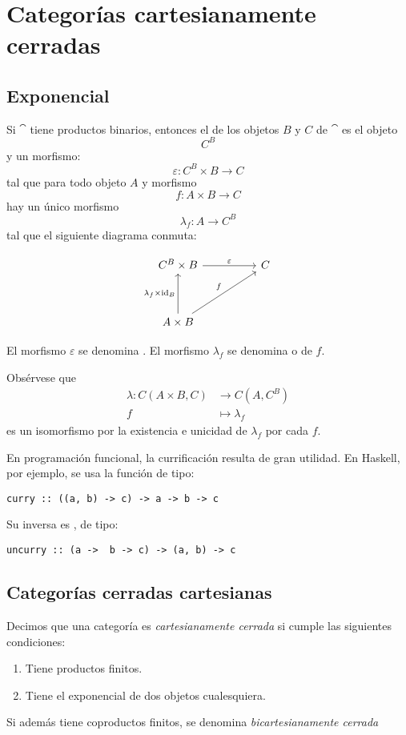 \chapter{Categorías cartesianamente cerradas}
\section{Exponencial}
Si $\cat$ tiene productos binarios, entonces el  de los objetos $B$ y $C$ de $\cat$ es el objeto
\[ C^B \]
y un morfismo:
\[ \varepsilon \colon C^B \times B \to C \]
tal que para todo objeto $A$ y morfismo
\[ f \colon A \times B \to C \]
hay un único morfismo
\[ \lambda_f \colon A \to C^B \]
tal que el siguiente diagrama conmuta:

\[
\begin{tikzcd}
C^B \times B \arrow[rr,"\varepsilon"] & & C \\\\
A \times B \arrow[uu,"\lambda_f\times\id_B"]  \arrow[uurr,"f"]
\end{tikzcd}
\]

El morfismo $\varepsilon$ se denomina .
El morfismo $\lambda_f$ se denomina  o  de $f$.

Obsérvese que
\begin{align*}
\lambda \colon C(A \times B, C) & \to C(A,C^B)\\
f & \mapsto \lambda_f
\end{align*}
es un isomorfismo por la existencia e unicidad de $\lambda_f$ por cada $f$.

En programación funcional, la currificación resulta de gran utilidad.
En Haskell, por ejemplo, se usa la función  de tipo:
\begin{verbatim}
curry :: ((a, b) -> c) -> a -> b -> c
\end{verbatim}
Su inversa es , de tipo:
\begin{verbatim}
uncurry :: (a ->  b -> c) -> (a, b) -> c
\end{verbatim}

\section{Categorías cerradas cartesianas}
\begin{definition}
Decimos que una categoría es \emph{cartesianamente cerrada} si cumple las siguientes condiciones:
\begin{enumerate}
\item Tiene productos finitos.
\item Tiene el exponencial de dos objetos cualesquiera.
\end{enumerate}
Si además tiene coproductos finitos, se denomina \emph{bicartesianamente cerrada}
\end{definition}


